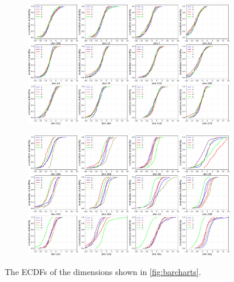 \begin{figure}[t]
    \centering
    \begin{subfigure}{\textwidth}
        \centering
        \includegraphics[width=.85\linewidth]{figures/ECDFs_similar.pdf}
    \vspace{5mm}
    \end{subfigure}
    \begin{subfigure}{\textwidth}
        \centering
        \includegraphics[width=.85\linewidth]{figures/ECDFs_dissimilar.pdf}
    \end{subfigure}
    \caption{The ECDFs of the dimensions shown in \autoref{fig:barcharts}.}
    \label{fig:ecdfs}
\end{figure}

